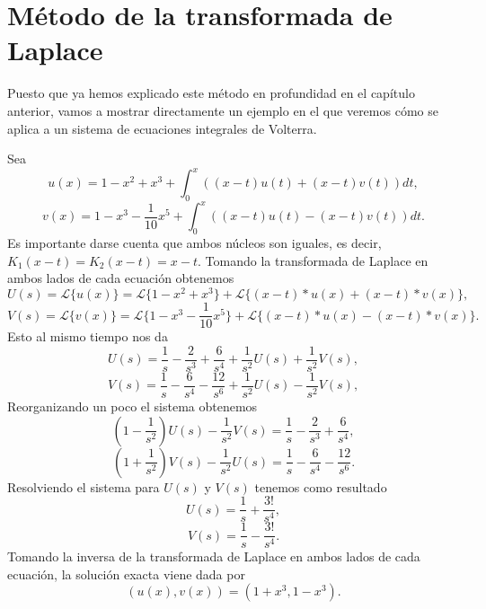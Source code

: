 \section{Método de la transformada de Laplace}
Puesto que ya hemos explicado este método en profundidad en el capítulo anterior, vamos a mostrar directamente un ejemplo en el que veremos cómo se aplica a un sistema de ecuaciones integrales de Volterra.
\begin{ejemplo}
	Sea
	\begin{equation}
		u(x) = 1 - x^2 + x^3 + \int_{0}^{x}((x-t)u(t) + (x-t)v(t))dt,
	\end{equation}
	\begin{equation}
		v(x) = 1 - x^3 - \dfrac{1}{10}x^5 + \int_{0}^{x}((x-t)u(t) - (x-t)v(t))dt.
	\end{equation}
	Es importante darse cuenta que ambos núcleos son iguales, es decir, $K_1(x-t) = K_2(x-t) = x-t$. Tomando la transformada de Laplace en ambos lados de cada ecuación obtenemos
	\begin{equation}
		U(s) = \mathcal{L}\{u(x)\} = \mathcal{L}\{1 - x^2 + x^3\} + \mathcal{L}\{(x-t)\ast u(x) + (x-t) \ast v(x)\},
	\end{equation}
	\begin{equation}
		V(s) = \mathcal{L}\{v(x)\} = \mathcal{L}\{1 - x^3 - \dfrac{1}{10}x^5\} + 	\mathcal{L}\{(x-t)\ast u(x) - (x-t) \ast v(x)\}.
	\end{equation}
	Esto al mismo tiempo nos da
	\begin{equation}
		U(s) = \dfrac{1}{s} - \dfrac{2}{s^3} + \dfrac{6}{s^4} + \dfrac{1}{s^2}U(s) + \dfrac{1}{s^2}V(s),
	\end{equation}
	\begin{equation}
		V(s) = \dfrac{1}{s} - \dfrac{6}{s^4} - \dfrac{12}{s^6} + \dfrac{1}{s^2}U(s) 	- \dfrac{1}{s^2}V(s),
	\end{equation}
	Reorganizando un poco el sistema obtenemos
	\begin{equation}
		(1-\dfrac{1}{s^2})U(s) - \dfrac{1}{s^2}V(s) = \dfrac{1}{s} - \dfrac{2}{s^3} + \dfrac{6}{s^4},
	\end{equation}
	\begin{equation}
		(1+\dfrac{1}{s^2})V(s) - \dfrac{1}{s^2}U(s) = \dfrac{1}{s} - \dfrac{6}{s^4}	- \dfrac{12}{s^6}.
	\end{equation}
	Resolviendo el sistema para $U(s)$ y $V(s)$ tenemos como resultado
	\begin{equation}
		U(s) = \dfrac{1}{s} + \dfrac{3!}{s^4},
	\end{equation}
	\begin{equation}
		V(s) = \dfrac{1}{s} - \dfrac{3!}{s^4}.
	\end{equation}
	Tomando la inversa de la transformada de Laplace en ambos lados de cada ecuación, la solución exacta viene dada por
	\begin{equation}
		(u(x),v(x)) = (1 + x^3, 1 - x^3).
	\end{equation}
\end{ejemplo}

